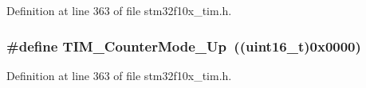 Definition at line 363 of file stm32f10x\+\_\+tim.\+h.

\subsubsection[{\texorpdfstring{T\+I\+M\+\_\+\+Counter\+Mode\+\_\+\+Up}{TIM_CounterMode_Up}}]{\setlength{\rightskip}{0pt plus 5cm}\#define T\+I\+M\+\_\+\+Counter\+Mode\+\_\+\+Up~(({\bf uint16\+\_\+t})0x0000)}\hypertarget{group___t_i_m___counter___mode_gaf4cd3ce74af3122507b77c8f6e79c832}{}\label{group___t_i_m___counter___mode_gaf4cd3ce74af3122507b77c8f6e79c832}


Definition at line 363 of file stm32f10x\+\_\+tim.\+h.

